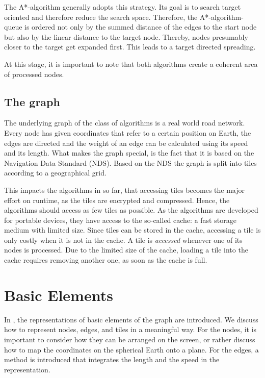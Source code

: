 \documentclass
[
    paper = a4,
    pagesize,
    12 pt,
    twoside,                       %
    open = right,
    DIV = calc,
    BCOR = 0 mm,                   %
    bibtotoc
]
{scrbook}
\begin{document}
The A*-algorithm generally adopts this strategy.
Its goal is to search target oriented and therefore reduce the search space.
Therefore, the A*-algorithm-queue is ordered not only by the summed distance of the edges to the start node but also by the linear distance to the target node.
Thereby, nodes presumably closer to the target get expanded first.
This leads to a target directed spreading.

At this stage, it is important to note that both algorithms create a coherent area of processed nodes.

\subsection{The graph} \label{spec_graph}

The underlying graph of the class of algorithms is a real world road network.
Every node has given coordinates that refer to a certain position on Earth, the edges are directed and the weight of an edge can be calculated using its speed and its length.
What makes the graph special, is the fact that it is based on the Navigation Data Standard (NDS).
Based on the NDS the graph is split into tiles according to a geographical grid.

This impacts the algorithms in so far, that accessing tiles becomes the major effort on runtime, as the tiles are encrypted and compressed.
Hence, the algorithms should access as few tiles as possible.
As the algorithms are developed for portable devices, they have access to the so-called cache: a fast storage medium with limited size.
Since tiles can be stored in the cache, accessing a tile is only costly when it is not in the cache.
A tile is \emph{accessed} whenever one of its nodes is processed.
Due to the limited size of the cache, loading a tile into the cache requires removing another one, as soon as the cache is full.


\section{Basic Elements}

In , the representations of basic elements of the graph are introduced.
We discuss how to represent nodes, edges, and tiles in a meaningful way.
For the nodes, it is important to consider how they can be arranged on the screen, or rather discuss how to map the coordinates on the spherical Earth onto a plane.
For the edges, a method is introduced that integrates the length and the speed in the representation.
\end{document}
